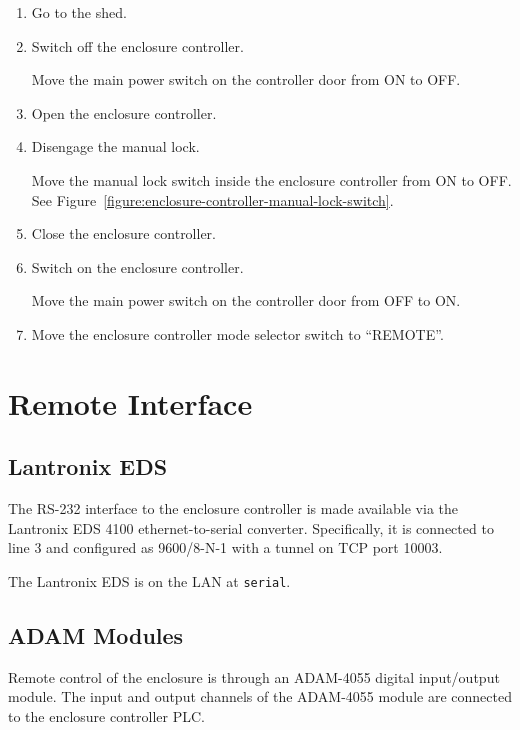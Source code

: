 \begin{enumerate}
\item
Go to the shed.

\item Switch off the enclosure controller.

Move the main power switch on the controller door from ON to OFF.

\item Open the enclosure controller.

\item
Disengage the manual lock.

Move the manual lock switch inside the enclosure controller from ON to OFF. See Figure~\ref{figure:enclosure-controller-manual-lock-switch}.

\item
Close the enclosure controller.

\item Switch on the enclosure controller.

Move the main power switch on the controller door from OFF to ON.

\item Move the enclosure controller mode selector switch to “REMOTE”.

\end{enumerate}

\section{Remote Interface}

\subsection{Lantronix EDS}

The RS-232 interface to the enclosure controller is made available via the Lantronix EDS 4100 ethernet-to-serial converter. Specifically, it is connected to line 3 and configured as 9600/8-N-1 with a tunnel on TCP port 10003.

The Lantronix EDS is on the LAN at \verb|serial|.

\subsection{ADAM Modules}
\label{section:enclosure-adam-modules}

Remote control of the enclosure is through an ADAM-4055 digital input/output module. The input and output channels of the ADAM-4055 module are connected to the enclosure controller PLC.

